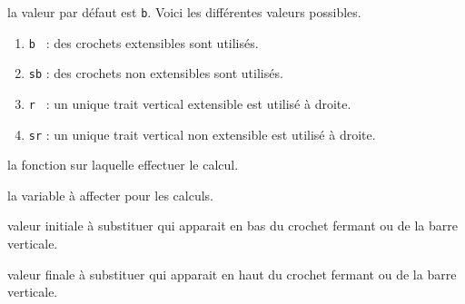 \documentclass[12pt,a4paper]{article}
\theoremstyle{definition}
\begin{document}



\IDoption{} la valeur par défaut est \verb+b+. Voici les différentes valeurs possibles.
\begin{enumerate}
	\item \verb+b + : des crochets extensibles sont utilisés.

	\item \verb+sb+ : des crochets non extensibles sont utilisés.

	\item \verb+r + : un unique trait vertical extensible est utilisé à droite.

	\item \verb+sr+ : un unique trait vertical non extensible est utilisé à droite.
\end{enumerate}

 la fonction sur laquelle effectuer le calcul.

 la variable à affecter pour les calculs.

 valeur initiale à substituer qui apparait en bas du crochet fermant ou de la barre verticale.

 valeur finale à substituer qui apparait en haut du crochet fermant ou de la barre verticale.
\end{document}
